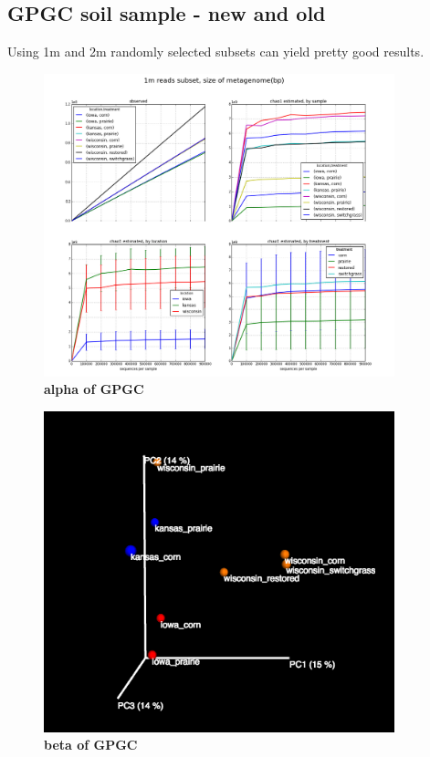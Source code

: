 \subsection{GPGC soil sample - new and old}



Using 1m and 2m randomly selected subsets can yield pretty good results.



\begin{figure}[!ht]
 \centerline{\includegraphics[width=4in]{./figures/GPGC_1m_old.png}}
\caption{\bf alpha of GPGC}
\label{fig:concept}
\end{figure}



\begin{figure}[!ht]
 \centerline{\includegraphics[width=4in]{./figures/GPGC_old_subset1M.png}}
\caption{\bf beta of GPGC}
\label{fig:concept}
\end{figure}

